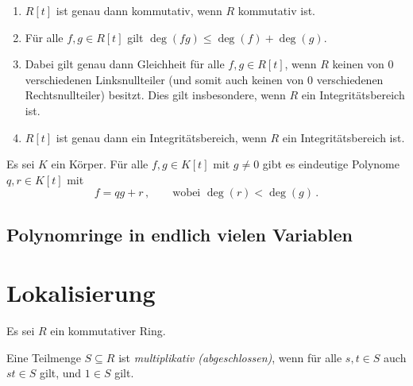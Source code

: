 \begin{proposition}
  \begin{enumerate}
    \item
      $R[t]$ ist genau dann kommutativ, wenn $R$ kommutativ ist.
    \item
      Für alle $f, g \in R[t]$ gilt $\deg(fg) \leq \deg(f) + \deg(g)$.
    \item
      Dabei gilt genau dann Gleichheit für alle $f, g \in R[t]$, wenn $R$ keinen von $0$ verschiedenen Linksnullteiler \textup(und somit auch keinen von $0$ verschiedenen Rechtsnullteiler\textup) besitzt.
      Dies gilt insbesondere, wenn $R$ ein Integritätsbereich ist.
    \item
      $R[t]$ ist genau dann ein Integritätsbereich, wenn $R$ ein Integritätsbereich ist.
  \end{enumerate}
\end{proposition}

\begin{proposition}[Polynomdivision]
  Es sei $K$ ein Körper.
  Für alle $f, g \in K[t]$ mit $g \neq 0$ gibt es eindeutige Polynome $q, r \in K[t]$ mit
  \[
    f = qg + r \,,
    \qquad
    \text{wobei $\deg(r) < \deg(g)$} \,.
  \]
\end{proposition}




\subsection{Polynomringe in endlich vielen Variablen}










 





\section{Lokalisierung}

Es sei $R$ ein kommutativer Ring.

\begin{definition}
  Eine Teilmenge $S \subseteq R$ ist \emph{multiplikativ \textup(abgeschlossen\textup)}, wenn für alle $s, t \in S$ auch $st \in S$ gilt, und $1 \in S$ gilt.
\end{definition}

